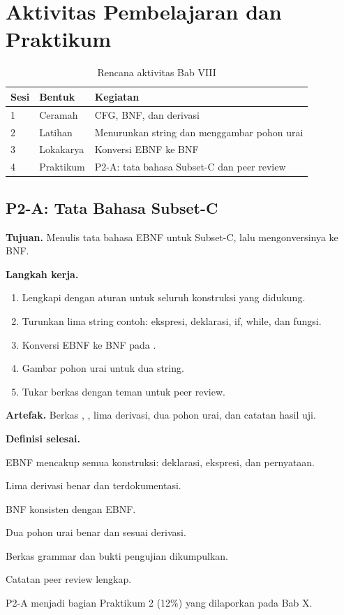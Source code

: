 \section*{Aktivitas Pembelajaran dan Praktikum}

\begin{table}[H]
\centering
\caption{Rencana aktivitas Bab VIII}
\label{tab:ch08-aktivitas}
\begin{tabularx}{\textwidth}{@{}llX@{}}
\toprule
\textbf{Sesi} & \textbf{Bentuk} & \textbf{Kegiatan} \\
\midrule
1 & Ceramah & CFG, BNF, dan derivasi \\
2 & Latihan & Menurunkan string dan menggambar pohon urai \\
3 & Lokakarya & Konversi EBNF ke BNF \\
4 & Praktikum & P2-A: tata bahasa Subset-C dan peer review \\
\bottomrule
\end{tabularx}
\end{table}

\subsection*{P2-A: Tata Bahasa Subset-C}
\textbf{Tujuan.} Menulis tata bahasa EBNF untuk Subset-C, lalu
mengonversinya ke BNF.

\textbf{Langkah kerja.}
\begin{enumerate}[label=\arabic*.,leftmargin=*]
  \item Lengkapi  dengan aturan untuk seluruh
        konstruksi yang didukung.
  \item Turunkan lima string contoh: ekspresi, deklarasi, if, while,
        dan fungsi.
  \item Konversi EBNF ke BNF pada .
  \item Gambar pohon urai untuk dua string.
  \item Tukar berkas dengan teman untuk peer review.
\end{enumerate}

\textbf{Artefak.} Berkas ,
, lima derivasi, dua pohon urai, dan catatan
hasil uji.

\textbf{Definisi selesai.}
\begin{checklist}
  \item EBNF mencakup semua konstruksi: deklarasi, ekspresi, dan
        pernyataan.
  \item Lima derivasi benar dan terdokumentasi.
  \item BNF konsisten dengan EBNF.
  \item Dua pohon urai benar dan sesuai derivasi.
  \item Berkas grammar dan bukti pengujian dikumpulkan.
  \item Catatan peer review lengkap.
\end{checklist}

P2-A menjadi bagian Praktikum 2 (12\%) yang dilaporkan pada Bab X.

